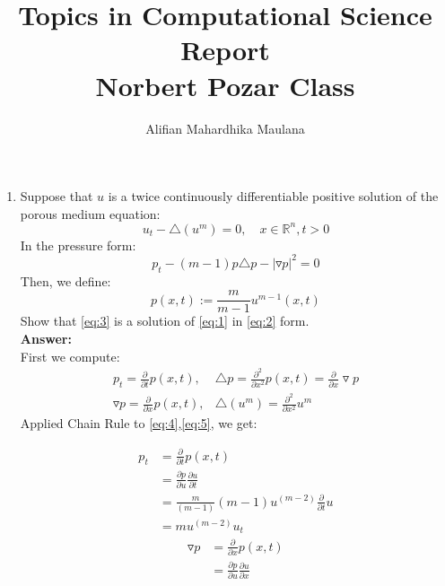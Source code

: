 \documentclass[a4paper,9pt]{article}
\title{Topics in Computational Science Report \\ Norbert Pozar Class}
\author{Alifian Mahardhika Maulana}
\newcommand{\R}{\mathbb{R}}
\begin{document}
\maketitle
\begin{enumerate}
	\item Suppose that $u$ is a twice continuously differentiable positive solution of the porous medium equation:
	\begin{equation}\label{eq:1}
	u_t - \triangle (u^m) = 0, \quad x \in \R^n, t>0
	\end{equation}
	In the pressure form:
	\begin{equation}\label{eq:2}
	p_t - (m-1)p \triangle p - |\triangledown p|^2 = 0
	\end{equation}
	Then, we define:
	\begin{equation}\label{eq:3}
	p(x,t) := \frac{m}{m-1} u^{m-1}(x,t)
	\end{equation}
	Show that \eqref{eq:3} is a solution of \eqref{eq:1} in \eqref{eq:2} form.\\
	\newline
	\textbf{Answer:}\\
	First we compute:
	\begin{eqnarray} \label{eq:4}
	p_t = \frac{\partial}{\partial t}p(x,t), & \triangle p = \frac{\partial^2}{\partial x^2} p(x,t) = \frac{\partial}{\partial x} \triangledown p\\ \label{eq:5}
	\triangledown p = \frac{\partial}{\partial x} p(x,t), & \triangle (u^m) = \frac{\partial^2}{\partial x^2} u^m
	\end{eqnarray}
	Applied Chain Rule to \eqref{eq:4},\eqref{eq:5}, we get:
	\begin{multicols}{2}
		\begin{equation}\label{eq:6}
		\begin{aligned}
		p_t &= \frac{\partial}{\partial t}p(x,t)\\
		&= \frac{\partial p}{\partial u} \frac{\partial u}{\partial t}\\
		&= \frac{m}{(m-1)} (m-1) u^{(m-2)} \frac{\partial}{\partial t}u\\
		&= m u^{(m-2)} u_t
		\end{aligned}
		\end{equation}
		\newline
		\begin{equation}\label{eq:7}
		\begin{aligned}
		\triangledown p &= \frac{\partial}{\partial x} p(x,t)\\
		&= \frac{\partial p}{\partial u} \frac{\partial u}{\partial x}\\

\end{aligned}
\end{equation}
\end{multicols}
\end{enumerate}
\end{document}
